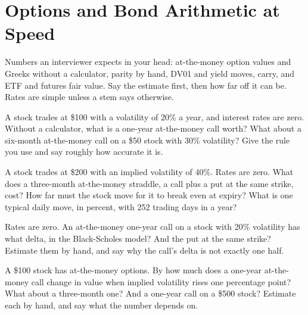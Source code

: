 \chapter{Options and Bond Arithmetic at Speed}\label{ch:iv2:options-and-bond-arithmetic-at-speed}

\begin{ivtrains}
Numbers an interviewer expects in your head: at-the-money option values and Greeks without a calculator, parity by hand, DV01 and yield moves, carry, and ETF and futures fair value. Say the estimate first, then how far off it can be. Rates are simple unless a stem says otherwise.
\end{ivtrains}

\begin{question}\label{iq:iv2:options-and-bond-arithmetic-at-speed:1}
A stock trades at \$100 with a volatility of 20\% a year, and interest rates are zero. Without a calculator, what is a one-year at-the-money call worth? What about a six-month at-the-money call on a \$50 stock with 30\% volatility? Give the rule you use and say roughly how accurate it is.
\end{question}

\begin{question}\label{iq:iv2:options-and-bond-arithmetic-at-speed:2}
A stock trades at \$200 with an implied volatility of 40\%. Rates are zero. What does a three-month at-the-money straddle, a call plus a put at the same strike, cost? How far must the stock move for it to break even at expiry? What is one typical daily move, in percent, with 252 trading days in a year?
\end{question}

\begin{question}\label{iq:iv2:options-and-bond-arithmetic-at-speed:3}
Rates are zero. An at-the-money one-year call on a stock with 20\% volatility has what delta, in the Black-Scholes model? And the put at the same strike? Estimate them by hand, and say why the call's delta is not exactly one half.
\end{question}

\begin{question}\label{iq:iv2:options-and-bond-arithmetic-at-speed:4}
A \$100 stock has at-the-money options. By how much does a one-year at-the-money call change in value when implied volatility rises one percentage point? What about a three-month one? And a one-year call on a \$500 stock? Estimate each by hand, and say what the number depends on.
\end{question}


